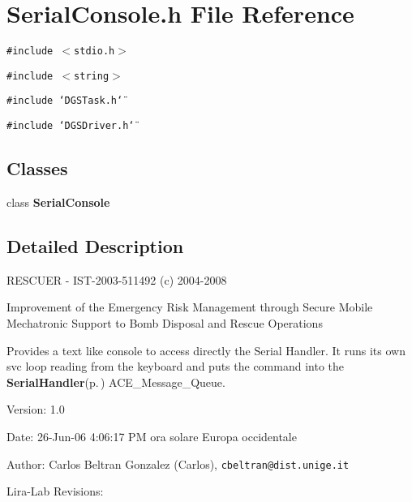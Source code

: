 \section{Serial\-Console.h File Reference}
\label{SerialConsole_8h}
{\tt \#include $<$stdio.h$>$}\par
{\tt \#include $<$string$>$}\par
{\tt \#include \char`\"{}DGSTask.h\char`\"{}}\par
{\tt \#include \char`\"{}DGSDriver.h\char`\"{}}\par
\subsection*{Classes}
\begin{CompactItemize}
\item 
class {\bf Serial\-Console}
\end{CompactItemize}


\subsection{Detailed Description}
RESCUER - IST-2003-511492 (c) 2004-2008

Improvement of the Emergency Risk Management through Secure Mobile Mechatronic Support to Bomb Disposal and Rescue Operations

Provides a text like console to access directly the Serial Handler. It runs its own svc loop reading from the keyboard and puts the command into the {\bf Serial\-Handler}{\rm (p.\,\pageref{classSerialHandler})} ACE\_\-Message\_\-Queue. \begin{Desc}
\item[Version:]1.0 \end{Desc}
\begin{Desc}
\item[Date:]26-Jun-06 4:06:17 PM ora solare Europa occidentale \end{Desc}
\begin{Desc}
\item[Author:]Carlos Beltran Gonzalez (Carlos), {\tt cbeltran@dist.unige.it} 

Lira-Lab Revisions:\end{Desc}
